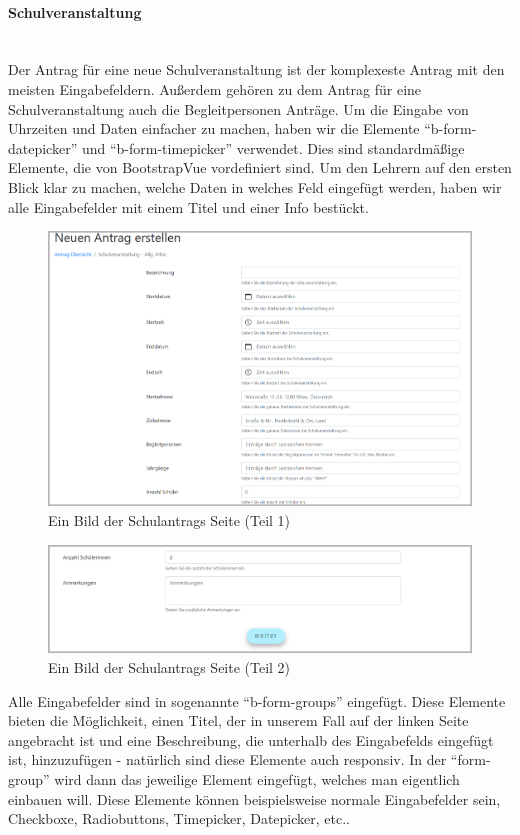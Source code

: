 \paragraph{Schulveranstaltung}
~\\
Der Antrag für eine neue Schulveranstaltung ist der komplexeste Antrag mit den meisten Eingabefeldern. Außerdem gehören zu dem Antrag für eine Schulveranstaltung auch die Begleitpersonen Anträge. Um die Eingabe von Uhrzeiten und Daten einfacher zu machen, haben wir die Elemente \enquote{b-form-datepicker} und \enquote{b-form-timepicker} verwendet. Dies sind standardmäßige Elemente, die von BootstrapVue vordefiniert sind. Um den Lehrern auf den ersten Blick klar zu machen, welche Daten in welches Feld eingefügt werden, haben wir alle Eingabefelder mit einem Titel und einer Info bestückt.
\begin{figure}[H]
	\centering
	\includegraphics[width=1\linewidth]{images/website/schul_1}
	\caption[Neuer Schulantrag]{Ein Bild der Schulantrags Seite (Teil 1)}
	\label{fig:schulantrag1}
\end{figure}
\begin{figure}[H]
	\centering
	\includegraphics[width=1\linewidth]{images/website/schul_2}
	\caption[Neuer Schulantrag]{Ein Bild der Schulantrags Seite (Teil 2)}
	\label{fig:schulantrag2}
\end{figure}
Alle Eingabefelder sind in sogenannte \enquote{b-form-groups} eingefügt. Diese Elemente bieten die Möglichkeit, einen Titel, der in unserem Fall auf der linken Seite angebracht ist und eine Beschreibung, die unterhalb des Eingabefelds eingefügt ist, hinzuzufügen - natürlich sind diese Elemente auch responsiv. In der \enquote{form-group} wird dann das jeweilige Element eingefügt, welches man eigentlich einbauen will. Diese Elemente können beispielsweise normale Eingabefelder sein, Checkboxe, Radiobuttons, Timepicker, Datepicker, etc.. 
